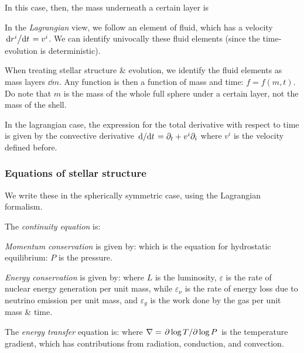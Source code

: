 \documentclass[main.tex]{subfiles}
\begin{document}
In this case, then, the mass underneath a certain layer is

In the \emph{Lagrangian} view, we follow an element of fluid, which has a velocity \(\dv*{r^i}{t} = v^i \). We can identify univocally these fluid elements (since the time-evolution is deterministic). 

When treating stellar structure \& evolution, we identify the fluid elements as mass layers \(\dd{m}\). Any function is then a function of mass and time: \(f = f(m, t)\). Do note that \(m\) is the mass of the whole full sphere under a certain layer, not the mass of the shell.

In the lagrangian case, the expression for the total derivative with respect to time is given by the convective derivative \(\dv*{}{t} = \partial_t + v^i \partial_i\) where \(v^i\) is the velocity defined before.

\subsubsection{Equations of stellar structure}

We write these in the spherically symmetric case, using the Lagrangian formalism. 

The \emph{continuity equation} is:
%
%

\emph{Momentum conservation} is given by:
%
%
which is the equation for hydrostatic equilibrium: \(P\) is the pressure. 

\emph{Energy conservation} is given by:
%
%
where \(L\) is the luminosity, \(\varepsilon\) is the rate of nuclear energy generation per unit mass, while \(\varepsilon_\nu\) is the rate of energy loss due to neutrino emission per unit mass, and \(\varepsilon_g \) is the work done by the gas per unit mass \& time.

The \emph{energy transfer} equation is:
%
%
where \(\nabla = \pdv*{\log T}{\log P} \) is the temperature gradient, which has contributions from radiation, conduction, and convection.
\end{document}
